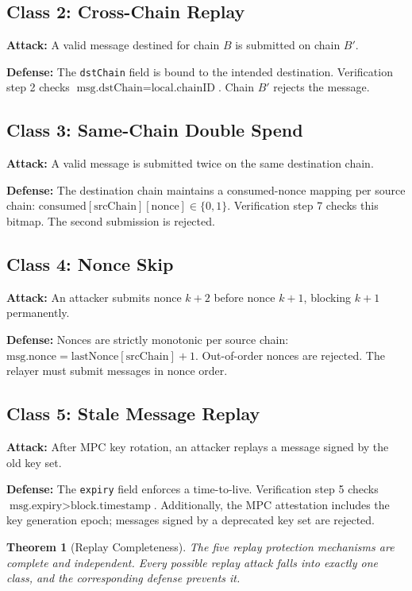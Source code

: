 \documentclass[11pt,a4paper]{article}
\newtheorem{theorem}{Theorem}[section]
\begin{document}
\subsection{Class 2: Cross-Chain Replay}

\textbf{Attack:} A valid message destined for chain $B$ is submitted on chain $B'$.

\textbf{Defense:} The \texttt{dstChain} field is bound to the intended destination. Verification step 2 checks $\text{msg.dstChain} = \text{local.chainID}$. Chain $B'$ rejects the message.

\subsection{Class 3: Same-Chain Double Spend}

\textbf{Attack:} A valid message is submitted twice on the same destination chain.

\textbf{Defense:} The destination chain maintains a consumed-nonce mapping per source chain: $\text{consumed}[\text{srcChain}][\text{nonce}] \in \{0, 1\}$. Verification step 7 checks this bitmap. The second submission is rejected.

\subsection{Class 4: Nonce Skip}

\textbf{Attack:} An attacker submits nonce $k+2$ before nonce $k+1$, blocking $k+1$ permanently.

\textbf{Defense:} Nonces are strictly monotonic per source chain: $\text{msg.nonce} = \text{lastNonce}[\text{srcChain}] + 1$. Out-of-order nonces are rejected. The relayer must submit messages in nonce order.

\subsection{Class 5: Stale Message Replay}

\textbf{Attack:} After MPC key rotation, an attacker replays a message signed by the old key set.

\textbf{Defense:} The \texttt{expiry} field enforces a time-to-live. Verification step 5 checks $\text{msg.expiry} > \text{block.timestamp}$. Additionally, the MPC attestation includes the key generation epoch; messages signed by a deprecated key set are rejected.

\begin{theorem}[Replay Completeness]
The five replay protection mechanisms are complete and independent. Every possible replay attack falls into exactly one class, and the corresponding defense prevents it.
\end{theorem}
\end{document}
